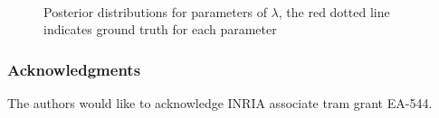 \documentclass{article}
\begin{document}
\begin{figure}[h]
  \centering
  \mbox{
    \quad
    \quad
  }
  \caption{Posterior distributions for parameters of $\lambda$, the red dotted line indicates ground truth for each parameter}
  \label{main figure label}
\end{figure}

\subsubsection*{Acknowledgments}

The authors would like to acknowledge INRIA associate tram grant EA-544.

\medskip

\small


\end{document}
